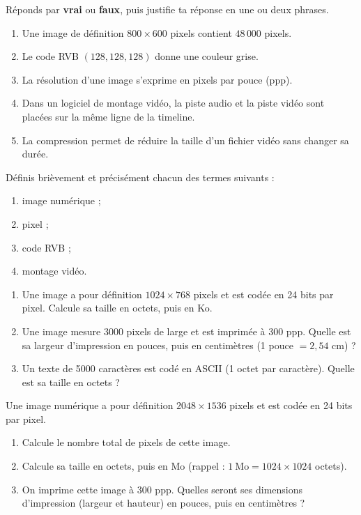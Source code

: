 \documentclass[11pt]{article}
\newcounter{popsec}
\newcounter{popsub}
\newcommand{\courssub}[1]{%
  \stepcounter{popsub}%
  \par\vspace{9pt}\noindent{\popxbold\fontsize{11.5}{13}\selectfont\color{popink}{\color{poporange}\thepopsec.\thepopsub}\hspace{6pt}#1}\par\nopagebreak\vspace{4pt}
}
\begin{document}
\begin{exercice}
Réponds par \textbf{vrai} ou \textbf{faux}, puis justifie ta réponse en une ou deux phrases.
\begin{enumerate}
  \item Une image de définition $800 \times 600$ pixels contient $48\,000$ pixels.
  \item Le code RVB $(128, 128, 128)$ donne une couleur grise.
  \item La résolution d'une image s'exprime en pixels par pouce (ppp).
  \item Dans un logiciel de montage vidéo, la piste audio et la piste vidéo sont placées sur la même ligne de la timeline.
  \item La compression permet de réduire la taille d'un fichier vidéo sans changer sa durée.
\end{enumerate}
\end{exercice}

\begin{exercice}[Définitions]
Définis brièvement et précisément chacun des termes suivants :
\begin{enumerate}
  \item image numérique ;
  \item pixel ;
  \item code RVB ;
  \item montage vidéo.
\end{enumerate}
\end{exercice}

\begin{exercice}
\begin{enumerate}
  \item Une image a pour définition $1024 \times 768$ pixels et est codée en 24 bits par pixel. Calcule sa taille en octets, puis en Ko.
  \item Une image mesure 3000 pixels de large et est imprimée à 300 ppp. Quelle est sa largeur d'impression en pouces, puis en centimètres (1 pouce $= 2,54$ cm) ?
  \item Un texte de 5000 caractères est codé en ASCII (1 octet par caractère). Quelle est sa taille en octets ?
\end{enumerate}
\end{exercice}

\courssub{Je m'entraîne}

\begin{exercice}
Une image numérique a pour définition $2048 \times 1536$ pixels et est codée en 24 bits par pixel.
\begin{enumerate}
  \item Calcule le nombre total de pixels de cette image.
  \item Calcule sa taille en octets, puis en Mo (rappel : $1~\text{Mo} = 1024 \times 1024$ octets).
  \item On imprime cette image à 300 ppp. Quelles seront ses dimensions d'impression (largeur et hauteur) en pouces, puis en centimètres ?
\end{enumerate}
\end{exercice}
\end{document}
